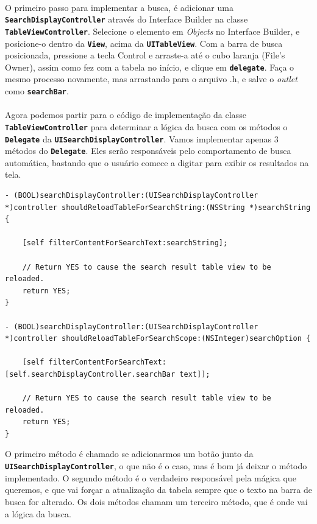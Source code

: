 \documentclass[a4paper,12pt,brazil,doubleside]{book}
\begin{document}
\paragraph{}O primeiro passo para implementar a busca, é adicionar uma \texttt{\textbf{SearchDisplayController}} através do Interface Builder na classe \texttt{\textbf{TableViewController}}. Selecione o elemento em \emph{Objects} no Interface Builder, e posicione-o dentro da \texttt{\textbf{View}}, acima da \texttt{\textbf{UITableView}}. Com a barra de busca posicionada, pressione a tecla Control e arraste-a até o cubo laranja (File's Owner), assim como fez com a tabela no início, e clique em \texttt{\textbf{delegate}}. Faça o mesmo processo novamente, mas arrastando para o arquivo .h, e salve o \emph{outlet} como \texttt{\textbf{searchBar}}.
\paragraph{}Agora podemos partir para o código de implementação da classe \texttt{\textbf{TableViewController}} para determinar a lógica da busca com os métodos o \texttt{\textbf{Delegate}} da \texttt{\textbf{UISearchDisplayController}}. Vamos implementar apenas 3 métodos do \texttt{\textbf{Delegate}}. Eles serão responsáveis pelo comportamento de busca automática, bastando que o usuário comece a digitar para exibir os resultados na tela.

\begin{listing}
\begin{verbatim}
- (BOOL)searchDisplayController:(UISearchDisplayController *)controller shouldReloadTableForSearchString:(NSString *)searchString {
    
    [self filterContentForSearchText:searchString];
    
    // Return YES to cause the search result table view to be reloaded.
    return YES;
}

- (BOOL)searchDisplayController:(UISearchDisplayController *)controller shouldReloadTableForSearchScope:(NSInteger)searchOption {
    
    [self filterContentForSearchText:[self.searchDisplayController.searchBar text]];
    
    // Return YES to cause the search result table view to be reloaded.
    return YES;
}
\end{verbatim}
\end{listing}

O primeiro método é chamado se adicionarmos um botão junto da \texttt{\textbf{UISearchDisplayController}}, o que não é o caso, mas é bom já deixar o método implementado. O segundo método é o verdadeiro responsável pela mágica que queremos, e que vai forçar a atualização da tabela sempre que o texto na barra de busca for alterado. Os dois métodos chamam um terceiro método, que é onde vai a lógica da busca.
\end{document}
